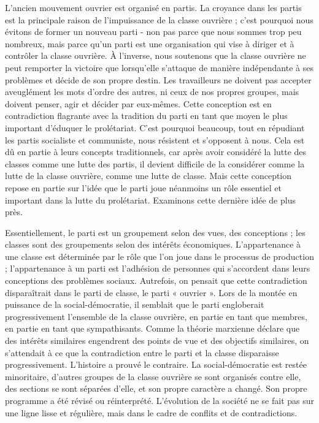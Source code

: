 L'ancien mouvement ouvrier est organisé en partis. La croyance dans les partis est la principale raison de l'impuissance de la classe ouvrière ; c'est pourquoi nous évitons de former un nouveau parti - non pas parce que nous sommes trop peu nombreux, mais parce qu'un parti est une organisation qui vise à diriger et à contrôler la classe ouvrière. À l'inverse, nous soutenons que la classe ouvrière ne peut remporter la victoire que lorsqu'elle s'attaque de manière indépendante à ses problèmes et décide de son propre destin. Les travailleurs ne doivent pas accepter aveuglément les mots d’ordre des autres, ni ceux de nos propres groupes, mais doivent penser, agir et décider par eux-mêmes. Cette conception est en contradiction flagrante avec la tradition du parti en tant que moyen le plus important d'éduquer le prolétariat. C'est pourquoi beaucoup, tout en répudiant les partis socialiste et communiste, nous résistent et s'opposent à nous. Cela est dû en partie à leurs concepts traditionnels, car après avoir considéré la lutte des classes comme une lutte des partis, il devient difficile de la considérer comme la lutte de la classe ouvrière, comme une lutte de classe. Mais cette conception repose en partie sur l'idée que le parti joue néanmoins un rôle essentiel et important dans la lutte du prolétariat. Examinons cette dernière idée de plus près.

Essentiellement, le parti est un groupement selon des vues, des conceptions ; les classes sont des groupements selon des intérêts économiques. L'appartenance à une classe est déterminée par le rôle que l'on joue dans le processus de production ; l'appartenance à un parti est l'adhésion de personnes qui s'accordent dans leurs conceptions des problèmes sociaux. Autrefois, on pensait que cette contradiction disparaîtrait dans le parti de classe, le parti « ouvrier ». Lors de la montée en puissance de la social-démocratie, il semblait que le parti engloberait progressivement l'ensemble de la classe ouvrière, en partie en tant que membres, en partie en tant que sympathisants. Comme la théorie marxienne déclare que des intérêts similaires engendrent des points de vue et des objectifs similaires, on s'attendait à ce que la contradiction entre le parti et la classe disparaisse progressivement. L'histoire a prouvé le contraire. La social-démocratie est restée minoritaire, d'autres groupes de la classe ouvrière se sont organisés contre elle, des sections se sont séparées d'elle, et son propre caractère a changé. Son propre programme a été révisé ou réinterprété. L'évolution de la société ne se fait pas sur une ligne lisse et régulière, mais dans le cadre de conflits et de contradictions.

